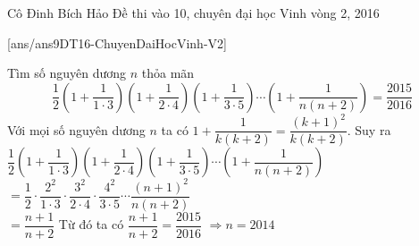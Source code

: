 \begin{name}
{Cô Đinh Bích Hảo}
{Đề thi vào 10, chuyên đại học Vinh vòng 2, 2016}
\end{name}
\setcounter{ex}{0}
[ans/ans9DT16-ChuyenDaiHocVinh-V2]
\begin{ex}%
   Tìm số nguyên dương $n$ thỏa mãn $$\dfrac{1}{2}\left(1+\dfrac{1}{1\cdot 3}\right)\left(1+\dfrac{1}{2\cdot4}\right)\left(1+\dfrac{1}{3\cdot 5}\right) \cdots \left(1+\dfrac{1}{n(n+2)}\right)=\dfrac{2015}{2016}$$
\loigiai
    {
  Với mọi số nguyên dương $n$ ta có $1+\dfrac{1}{k(k+2)}=\dfrac{(k+1)^2}{k(k+2)}$.
  Suy ra\\
  $\dfrac{1}{2}\left(1+\dfrac{1}{1\cdot 3}\right)\left(1+\dfrac{1}{2\cdot4}\right)\left(1+\dfrac{1}{3\cdot 5}\right) \cdots \left(1+\dfrac{1}{n(n+2)}\right)$\\
  $=\dfrac{1}{2} \cdot \dfrac{2^2}{1 \cdot 3} \cdot \dfrac{3^2}{2 \cdot 4} \cdot \dfrac{4^2}{3 \cdot 5} \cdots \dfrac{(n+1)^2}{n(n+2)}$\\
  $=\dfrac{n+1}{n+2}$ 
  Từ đó ta có $\dfrac{n+1}{n+2}=\dfrac{2015}{2016}$ $\Rightarrow n=2014$\\
    }
\end{ex}

